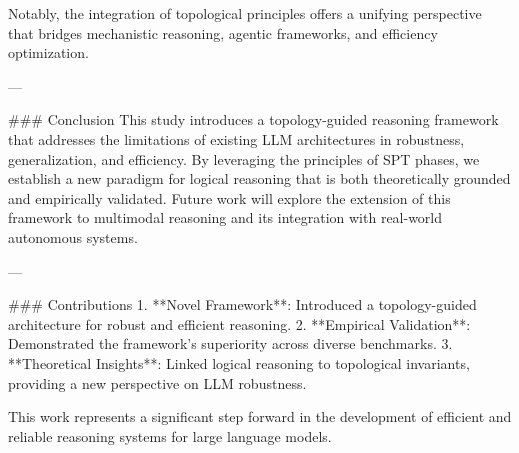Notably, the integration of topological principles offers a unifying perspective that bridges mechanistic reasoning, agentic frameworks, and efficiency optimization.

---

### Conclusion
This study introduces a topology-guided reasoning framework that addresses the limitations of existing LLM architectures in robustness, generalization, and efficiency. By leveraging the principles of SPT phases, we establish a new paradigm for logical reasoning that is both theoretically grounded and empirically validated. Future work will explore the extension of this framework to multimodal reasoning and its integration with real-world autonomous systems.

---

### Contributions
1. **Novel Framework**: Introduced a topology-guided architecture for robust and efficient reasoning.
2. **Empirical Validation**: Demonstrated the framework’s superiority across diverse benchmarks.
3. **Theoretical Insights**: Linked logical reasoning to topological invariants, providing a new perspective on LLM robustness.

This work represents a significant step forward in the development of efficient and reliable reasoning systems for large language models.